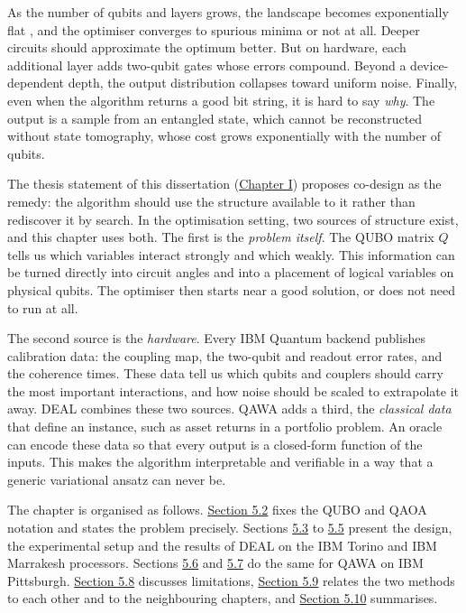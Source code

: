 \documentclass{report}
\theoremstyle{plain}
\theoremstyle{definition}
\theoremstyle{remark}
\begin{document}
As the number of qubits and layers grows, the landscape becomes exponentially flat \cite{mcclean2018barren}, and the optimiser converges to spurious minima or not at all. Deeper circuits should approximate the optimum better. But on hardware, each additional layer adds two-qubit gates whose errors compound. Beyond a device-dependent depth, the output distribution collapses toward uniform noise. Finally, even when the algorithm returns a good bit string, it is hard to say \emph{why}. The output is a sample from an entangled state, which cannot be reconstructed without state tomography, whose cost grows exponentially with the number of qubits.

The thesis statement of this dissertation (\hyperref[ch:intro]{Chapter I}) proposes co-design as the remedy: the algorithm should use the structure available to it rather than rediscover it by search. In the optimisation setting, two sources of structure exist, and this chapter uses both. The first is the \emph{problem itself}. The QUBO matrix $Q$ tells us which variables interact strongly and which weakly. This information can be turned directly into circuit angles and into a placement of logical variables on physical qubits. The optimiser then starts near a good solution, or does not need to run at all.

The second source is the \emph{hardware}. Every IBM Quantum backend publishes calibration data: the coupling map, the two-qubit and readout error rates, and the coherence times. These data tell us which qubits and couplers should carry the most important interactions, and how noise should be scaled to extrapolate it away. DEAL combines these two sources. QAWA adds a third, the \emph{classical data} that define an instance, such as asset returns in a portfolio problem. An oracle can encode these data so that every output is a closed-form function of the inputs. This makes the algorithm interpretable and verifiable in a way that a generic variational ansatz can never be.

The chapter is organised as follows. \hyperref[sec:nisq:problem]{Section 5.2} fixes the QUBO and QAOA notation and states the problem precisely. Sections \hyperref[sec:nisq:deal]{5.3} to \hyperref[sec:nisq:deal-results]{5.5} present the design, the experimental setup and the results of DEAL on the IBM Torino and IBM Marrakesh processors. Sections \hyperref[sec:nisq:qawa]{5.6} and \hyperref[sec:nisq:qawa-results]{5.7} do the same for QAWA on IBM Pittsburgh. \hyperref[sec:nisq:discussion]{Section 5.8} discusses limitations, \hyperref[sec:nisq:relation]{Section 5.9} relates the two methods to each other and to the neighbouring chapters, and \hyperref[sec:nisq:summary]{Section 5.10} summarises.
\end{document}
